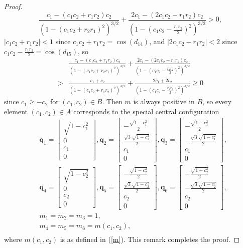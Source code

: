 \documentclass[12pt]{amsart}
\theoremstyle{definition}
\newcommand {\q} {\mathbf{q}}
\begin{document}
{\begin{proof}
\begin{equation*}
\frac{c_1-(c_1c_2+r_1r_2)c_2}{(1-(c_1c_2+r_2r_1)^2)^{3/2}}+\frac{2c_1-(2c_1c_2-r_1r_2)c_2}{(1-(c_1c_2-\frac{r_1r_2}{2})^2)^{3/2}}>0,
\end{equation*}
$|c_1c_2+r_1r_2| < 1$  since $c_1c_2+r_1r_2=\cos(d_{14})$, and $|2c_1c_2-r_1r_2|< 2$ since $c_1c_2-\frac{r_1r_2}{2}=\cos(d_{15})$, so \begin{align*}
&\frac{c_1-(c_1c_2+r_1r_2)c_2}{(1-(c_1c_2+r_2r_1)^2)^{3/2}}+\frac{2c_1-(2c_1c_2-r_1r_2)c_2}{(1-(c_1c_2-\frac{r_1r_2}{2})^2)^{3/2}}\\
> &\frac{c_1+c_2}{(1-(c_1c_2+r_1r_2)^2)^{3/2}}+\frac{2c_1+2c_2}{(1-(c_1c_2-\frac{r_1r_2}{2})^2)^{3/2}}
\geq 0\end{align*}
since $c_1 \geq -c_2 $ for $(c_1,c_2) \in B$. Then $m$ is always positive in $B$, so every element $(c_1,c_2) \in A$ corresponds to the special central configuration 
\begin{align*}
&\q_1=\begin{bmatrix}\sqrt{1-c_1^2}\\0\\c_1\\0\end{bmatrix}, \q_2=\begin{bmatrix}-\frac{\sqrt{1-c_1^2}}{2}\\ \frac{\sqrt{3}\sqrt{1-c_1^2}}{2}\\ c_1\\0\end{bmatrix}, \q_3=\begin{bmatrix}-\frac{\sqrt{1-c_1^2}}{2}\\-\frac{\sqrt{3}\sqrt{1-c_1^2}}{2} \\ c_1\\0\end{bmatrix},\\
&\q_4=\begin{bmatrix}\sqrt{1-c_2^2}\\0\\c_2\\0\end{bmatrix}, \q_5=\begin{bmatrix}-\frac{\sqrt{1-c_2^2}}{2}\\ \frac{\sqrt{3}\sqrt{1-c_2^2}}{2}\\ c_2\\0\end{bmatrix}, \q_6=\begin{bmatrix}-\frac{\sqrt{1-c_2^2}}{2}\\ -\frac{\sqrt{3}\sqrt{1-c_2^2}}{2}\\c_2\\0\end{bmatrix},\\
&m_1=m_2=m_3=1,\\
&m_4=m_5=m_6=m(c_1,c_2),\\
\end{align*}
where $m(c_1,c_2)$ is as defined in (\ref{m}). This remark completes the proof.
\end{proof}


}
\end{document}
